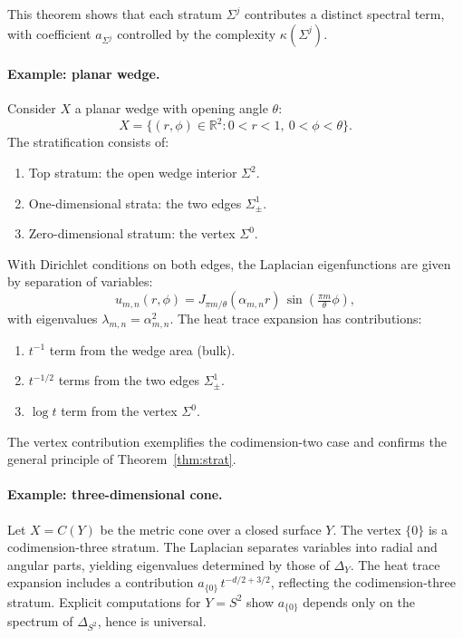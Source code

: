 This theorem shows that each stratum $\Sigma^j$ contributes a distinct spectral term,
with coefficient $a_{\Sigma^j}$ controlled by the complexity $\kappa(\Sigma^j)$.

\paragraph{Example: planar wedge.}
Consider $X$ a planar wedge with opening angle $\theta$:
\[
X=\{(r,\phi)\in\mathbb{R}^2: 0<r<1,\ 0<\phi<\theta\}.
\]
The stratification consists of:
\begin{enumerate}
\item Top stratum: the open wedge interior $\Sigma^2$.
\item One-dimensional strata: the two edges $\Sigma^1_\pm$.
\item Zero-dimensional stratum: the vertex $\Sigma^0$.
\end{enumerate}

With Dirichlet conditions on both edges, the Laplacian eigenfunctions
are given by separation of variables:
\[
u_{m,n}(r,\phi) = J_{\pi m/\theta}(\alpha_{m,n} r)\,\sin\!\left(\tfrac{\pi m}{\theta}\phi\right),
\]
with eigenvalues $\lambda_{m,n}=\alpha_{m,n}^2$.
The heat trace expansion has contributions:
\begin{enumerate}
\item $t^{-1}$ term from the wedge area (bulk).
\item $t^{-1/2}$ terms from the two edges $\Sigma^1_\pm$.
\item $\log t$ term from the vertex $\Sigma^0$.
\end{enumerate}
The vertex contribution exemplifies the codimension-two case
and confirms the general principle of Theorem~\ref{thm:strat}.

\paragraph{Example: three-dimensional cone.}
Let $X=C(Y)$ be the metric cone over a closed surface $Y$.
The vertex $\{0\}$ is a codimension-three stratum.
The Laplacian separates variables into radial and angular parts,
yielding eigenvalues determined by those of $\Delta_Y$.
The heat trace expansion includes a contribution
$a_{\{0\}}\,t^{-d/2+3/2}$, reflecting the codimension-three stratum.
Explicit computations for $Y=S^2$ show
$a_{\{0\}}$ depends only on the spectrum of $\Delta_{S^2}$,
hence is universal.

